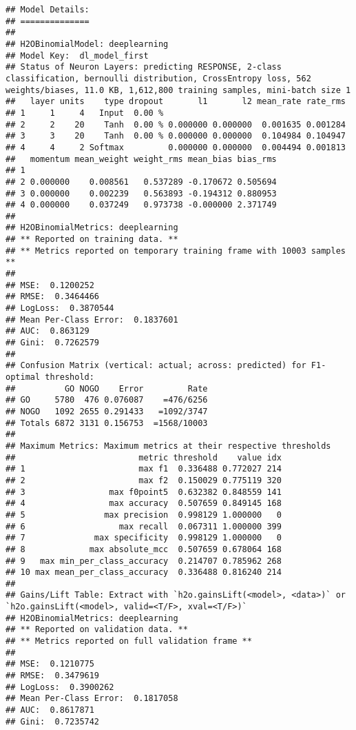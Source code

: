 \documentclass[]{article}
\begin{document}
\begin{verbatim}
## Model Details:
## ==============
## 
## H2OBinomialModel: deeplearning
## Model Key:  dl_model_first 
## Status of Neuron Layers: predicting RESPONSE, 2-class classification, bernoulli distribution, CrossEntropy loss, 562 weights/biases, 11.0 KB, 1,612,800 training samples, mini-batch size 1
##   layer units    type dropout       l1       l2 mean_rate rate_rms
## 1     1     4   Input  0.00 %                                     
## 2     2    20    Tanh  0.00 % 0.000000 0.000000  0.001635 0.001284
## 3     3    20    Tanh  0.00 % 0.000000 0.000000  0.104984 0.104947
## 4     4     2 Softmax         0.000000 0.000000  0.004494 0.001813
##   momentum mean_weight weight_rms mean_bias bias_rms
## 1                                                   
## 2 0.000000    0.008561   0.537289 -0.170672 0.505694
## 3 0.000000    0.002239   0.563893 -0.194312 0.880953
## 4 0.000000    0.037249   0.973738 -0.000000 2.371749
## 
## H2OBinomialMetrics: deeplearning
## ** Reported on training data. **
## ** Metrics reported on temporary training frame with 10003 samples **
## 
## MSE:  0.1200252
## RMSE:  0.3464466
## LogLoss:  0.3870544
## Mean Per-Class Error:  0.1837601
## AUC:  0.863129
## Gini:  0.7262579
## 
## Confusion Matrix (vertical: actual; across: predicted) for F1-optimal threshold:
##          GO NOGO    Error         Rate
## GO     5780  476 0.076087    =476/6256
## NOGO   1092 2655 0.291433   =1092/3747
## Totals 6872 3131 0.156753  =1568/10003
## 
## Maximum Metrics: Maximum metrics at their respective thresholds
##                         metric threshold    value idx
## 1                       max f1  0.336488 0.772027 214
## 2                       max f2  0.150029 0.775119 320
## 3                 max f0point5  0.632382 0.848559 141
## 4                 max accuracy  0.507659 0.849145 168
## 5                max precision  0.998129 1.000000   0
## 6                   max recall  0.067311 1.000000 399
## 7              max specificity  0.998129 1.000000   0
## 8             max absolute_mcc  0.507659 0.678064 168
## 9   max min_per_class_accuracy  0.214707 0.785962 268
## 10 max mean_per_class_accuracy  0.336488 0.816240 214
## 
## Gains/Lift Table: Extract with `h2o.gainsLift(<model>, <data>)` or `h2o.gainsLift(<model>, valid=<T/F>, xval=<T/F>)`
## H2OBinomialMetrics: deeplearning
## ** Reported on validation data. **
## ** Metrics reported on full validation frame **
## 
## MSE:  0.1210775
## RMSE:  0.3479619
## LogLoss:  0.3900262
## Mean Per-Class Error:  0.1817058
## AUC:  0.8617871
## Gini:  0.7235742

\end{verbatim}
\end{document}
